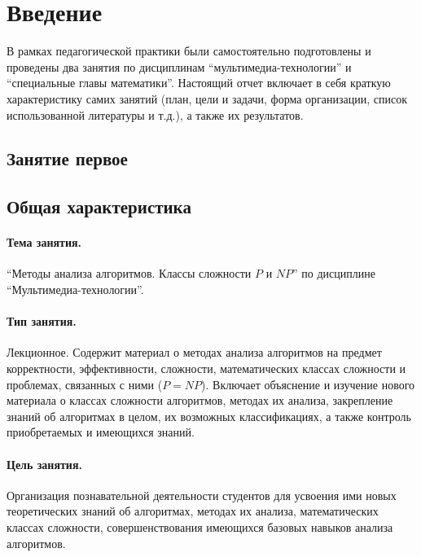 \section*{Введение}

В рамках педагогической практики были самостоятельно подготовлены и проведены два занятия по дисциплинам \enquote{мультимедиа-технологии} и \enquote{специальные главы математики}. Настоящий отчет включает в себя краткую характеристику самих занятий (план, цели и задачи, форма организации, список использованной литературы и т.д.), а также их результатов.

\begin{refsection}
\section{Занятие первое}

\subsection{Общая характеристика}

    \paragraph{Тема занятия.} \enquote{Методы анализа алгоритмов. Классы сложности $P$ и $NP$} по дисциплине \enquote{Мультимедиа-технологии}.

    \paragraph{Тип занятия.} Лекционное. Содержит материал о методах анализа алгоритмов на предмет корректности, эффективности, сложности, математических классах сложности и проблемах, связанных с ними ($P = NP$). Включает объяснение и изучение нового материала о классах сложности алгоритмов, методах их анализа, закрепление знаний об алгоритмах в целом, их возможных классификациях, а также контроль приобретаемых и имеющихся знаний.

    \paragraph{Цель занятия.} Организация познавательной деятельности студентов для усвоения ими новых теоретических знаний об алгоритмах, методах их анализа, математических классах сложности, совершенствования имеющихся базовых навыков анализа алгоритмов.


\end{refsection}
